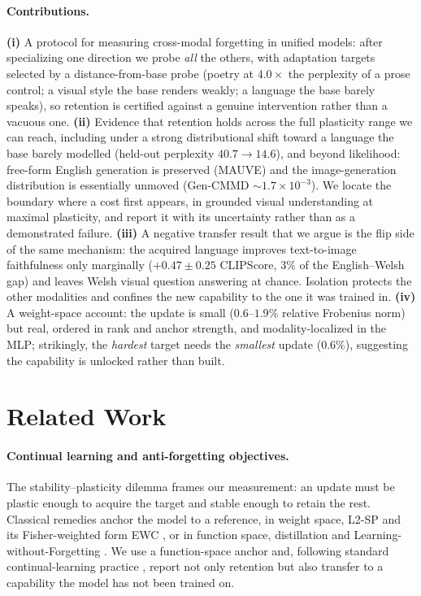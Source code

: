 \documentclass{article}
\begin{document}
\paragraph{Contributions.}
\textbf{(i)} A protocol for measuring cross-modal forgetting in unified models:
after specializing one direction we probe \emph{all} the others, with adaptation
targets selected by a distance-from-base probe (poetry at $4.0\times$ the
perplexity of a prose control; a visual style the base renders weakly; a
language the base barely speaks), so retention is certified against a genuine
intervention rather than a vacuous one.
\textbf{(ii)} Evidence that retention holds across the full plasticity range we
can reach, including under a strong distributional shift toward a language the
base barely modelled (held-out perplexity $40.7\to14.6$), and beyond likelihood:
free-form English generation
is preserved (MAUVE) and the image-generation distribution is essentially
unmoved (Gen-CMMD $\sim\!1.7\times10^{-3}$). We locate the boundary where a cost
first appears, in grounded visual understanding at maximal plasticity, and
report it with its uncertainty rather than as a demonstrated failure.
\textbf{(iii)} A negative transfer result that we argue is the flip side of the
same mechanism: the acquired language improves text-to-image faithfulness only
marginally ($+0.47\pm0.25$ CLIPScore, $3\%$ of the English--Welsh gap) and
leaves Welsh visual question answering at chance. Isolation protects the other
modalities and confines the new capability to the one it was trained in.
\textbf{(iv)} A weight-space account: the update is small ($0.6$--$1.9\%$
relative Frobenius norm) but real, ordered in rank and anchor strength, and
modality-localized in the MLP; strikingly, the \emph{hardest} target needs the
\emph{smallest} update ($0.6\%$), suggesting the capability is unlocked rather
than built.

\section{Related Work}
\paragraph{Continual learning and anti-forgetting objectives.}
The stability--plasticity dilemma \citep{mermillod2013stability} frames our
measurement: an update must be plastic enough to acquire the target and stable
enough to retain the rest. Classical remedies anchor the model to a reference,
in weight space, L2-SP \citep{xuhong2018l2sp} and its Fisher-weighted form EWC
\citep{kirkpatrick2017ewc}, or in function space, distillation
\citep{hinton2015distilling} and Learning-without-Forgetting
\citep{li2017lwf}. We use a function-space anchor and, following standard
continual-learning practice \citep{lopezpaz2017gem}, report not only retention
but also transfer to a capability the model has not been trained on.
\end{document}
